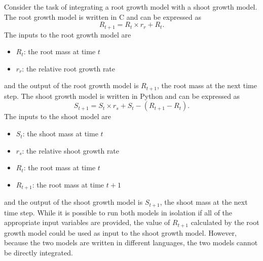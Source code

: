 \documentclass[journal]{IEEEtran}
\begin{document}
Consider the task of integrating a root growth model with a shoot growth model. The root growth model is written in C and can be expressed as
\begin{equation}
R_{t+1} = R_{t} \times r_{r} + R_{t}.
\end{equation}
The inputs to the root growth model are
\begin{itemize}
	\item $R_{t}$: the root mass at time $t$
	\item $r_{r}$: the relative root growth rate
\end{itemize}
and the output of the root growth model is $R_{t+1}$, the root mass at the next time step. 
%
The shoot growth model is written in Python and can be expressed as
\begin{equation}
S_{t+1} = S_{t} \times r_{s} + S_{t} - (R_{t+1} - R_{t}).
\end{equation}
The inputs to the shoot model are 
\begin{itemize}
	\item $S_{t}$: the shoot mass at time $t$
	\item $r_{s}$: the relative shoot growth rate
	\item $R_{t}$: the root mass at time $t$ 
	\item $R_{t+1}$: the root mass at time $t+1$ 
\end{itemize}
and the output of the shoot growth model is $S_{t+1}$, the shoot mass at the next time step.
%
While it is possible to run both models in isolation if all of the appropriate input variables are provided, the value of $R_{t+1}$ calculated by the root growth model could be used as input to the shoot growth model. However, because the two models are written in different languages, the two models cannot be directly integrated.
\end{document}
